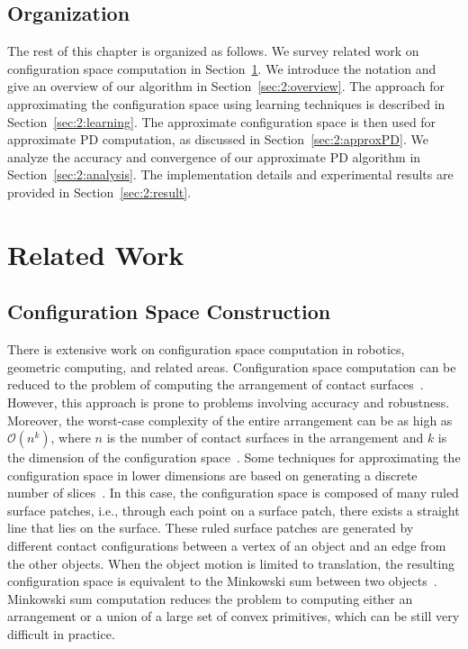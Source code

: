 \subsection{Organization}
The rest of this chapter is organized as follows. We survey related work on configuration space computation in Section~\ref{sec:2:related}. We introduce the notation and give an overview of our algorithm in Section~\ref{sec:2:overview}. The approach for approximating the configuration space using learning techniques is described in Section~\ref{sec:2:learning}. The approximate configuration space is then used for approximate PD computation, as discussed in Section~\ref{sec:2:approxPD}. We analyze the accuracy and convergence of our approximate PD algorithm in Section~\ref{sec:2:analysis}. The implementation details and experimental results are provided in Section~\ref{sec:2:result}.

\section{Related Work}
\label{sec:2:related}
\subsection{Configuration Space Construction}
There is extensive work on configuration space computation in robotics, geometric computing, and related areas.
Configuration space computation can be reduced to the problem of computing the arrangement of contact surfaces~\cite{Varadhan:2006:TPA}.
However, this approach is prone to problems involving accuracy and robustness. Moreover, the worst-case complexity of the entire arrangement can be as high as $\mathcal O(n^k)$, where $n$ is the number of contact surfaces in the arrangement and $k$ is the dimension of the configuration space~\cite{Goodman:Rourke:1997}. Some techniques for approximating the configuration space in lower dimensions are based on generating a discrete number of slices~\cite{Sacks:SCS:1997}. In this case, the configuration space is composed of many ruled surface patches, i.e., through each point on a surface patch, there exists a straight line that lies on the surface. These ruled surface patches are generated by different contact configurations between a vertex of an object and an edge from the other objects. When the object motion is limited to translation, the resulting configuration space is equivalent to the Minkowski sum between two objects~\cite{Leonidas:CCRS:1987,LPT:SpatialPlanning:1983}. Minkowski sum computation reduces the problem to computing either an arrangement or a union of a large set of convex primitives, which can be still very difficult in practice.

